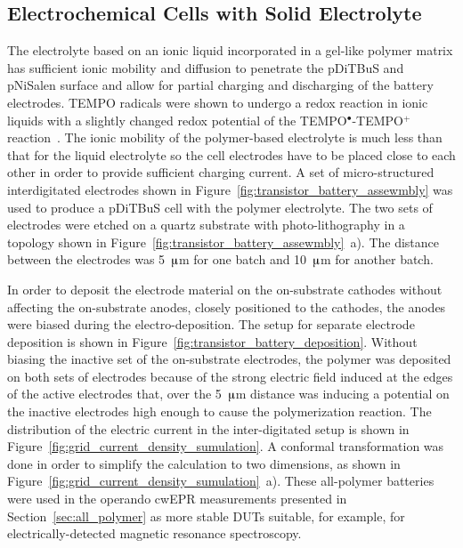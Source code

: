\subsection{Electrochemical Cells with Solid Electrolyte}
The electrolyte based on an ionic liquid incorporated in a gel-like polymer matrix has sufficient ionic mobility and diffusion to penetrate the pDiTBuS and pNiSalen surface and allow for partial charging and discharging of the battery electrodes. TEMPO radicals were shown to undergo a redox reaction in ionic liquids with a slightly changed redox potential of the TEMPO$^{\bullet}$-TEMPO$^+$ reaction~\cite{Golovisnina2023}. The ionic mobility of the polymer-based electrolyte is much less than that for the liquid electrolyte so the cell electrodes have to be placed close to each other in order to provide sufficient charging current. A set of micro-structured interdigitated electrodes shown in Figure~\ref{fig:transistor_battery_assewmbly} was used to produce a pDiTBuS cell with the polymer electrolyte. The two sets of electrodes were etched on a quartz substrate with photo-lithography in a topology shown in Figure~\ref{fig:transistor_battery_assewmbly}~a). The distance between the electrodes was 5~$\muup$m for one batch and 10~$\muup$m for another batch.\\
\par
In order to deposit the electrode material on the on-substrate cathodes without affecting the on-substrate anodes, closely positioned to the cathodes, the anodes were biased during the electro-deposition. The setup for separate electrode deposition is shown in Figure~\ref{fig:transistor_battery_deposition}. Without biasing the inactive set of the on-substrate electrodes, the polymer was deposited on both sets of electrodes because of the strong electric field induced at the edges of the active electrodes that, over the 5~$\muup$m distance was inducing a potential on the inactive electrodes high enough to cause the polymerization reaction. The distribution of the electric current in the inter-digitated setup is shown in Figure~\ref{fig:grid_current_density_sumulation}. A conformal transformation was done in order to simplify the calculation to two dimensions, as shown in Figure~\ref{fig:grid_current_density_sumulation}~a). These all-polymer batteries were used in the operando cwEPR measurements presented in Section~\ref{sec:all_polymer} as more stable DUTs suitable, for example, for electrically-detected magnetic resonance spectroscopy.  

